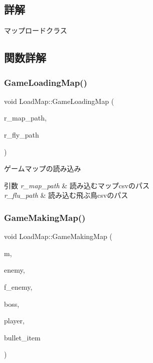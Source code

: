 \subsection{詳解}
マップロードクラス 

\subsection{関数詳解}
\mbox{\label{class_load_map_a534a2ac8151a7549b1fed723759ab2d0}} 
\subsubsection{\texorpdfstring{Game\+Loading\+Map()}{GameLoadingMap()}}
{\footnotesize\ttfamily void Load\+Map\+::\+Game\+Loading\+Map (\begin{DoxyParamCaption}\item[{W\+C\+H\+AR $\ast$}]{r\+\_\+map\+\_\+path,  }\item[{W\+C\+H\+AR $\ast$}]{r\+\_\+fly\+\_\+path }\end{DoxyParamCaption})}



ゲームマップの読み込み 


\begin{DoxyParams}{引数}
{\em r\+\_\+map\+\_\+path} & 読み込むマップcsvのパス \\
\hline
{\em r\+\_\+flu\+\_\+path} & 読み込む飛ぶ鳥csvのパス \\
\hline
\end{DoxyParams}
\mbox{\label{class_load_map_a44d4c9299837322a7eedbb298b6dbda9}} 
\subsubsection{\texorpdfstring{Game\+Making\+Map()}{GameMakingMap()}}
{\footnotesize\ttfamily void Load\+Map\+::\+Game\+Making\+Map (\begin{DoxyParamCaption}\item[{std\+::vector$<$ \mbox{\hyperlink{class_map_object}{Map\+Object}} $>$ \&}]{m,  }\item[{std\+::list$<$ \mbox{\hyperlink{class_normal_enemy}{Normal\+Enemy}} $>$ \&}]{enemy,  }\item[{std\+::list$<$ \mbox{\hyperlink{class_fly_enemy}{Fly\+Enemy}} $>$ \&}]{f\+\_\+enemy,  }\item[{std\+::unique\+\_\+ptr$<$ \mbox{\hyperlink{class_boss}{Boss}} $>$ \&}]{boss,  }\item[{std\+::unique\+\_\+ptr$<$ \mbox{\hyperlink{class_player}{Player}} $>$ \&}]{player,  }\item[{std\+::list$<$ \mbox{\hyperlink{class_bullet_item}{Bullet\+Item}} $>$ \&}]{bullet\+\_\+item }\end{DoxyParamCaption})}



